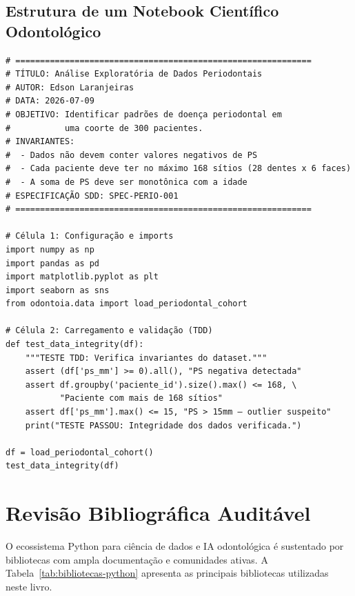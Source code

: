 \subsection{Estrutura de um Notebook Científico Odontológico}

\begin{verbatim}
# ============================================================
# TÍTULO: Análise Exploratória de Dados Periodontais
# AUTOR: Edson Laranjeiras
# DATA: 2026-07-09
# OBJETIVO: Identificar padrões de doença periodontal em
#           uma coorte de 300 pacientes.
# INVARIANTES:
#  - Dados não devem conter valores negativos de PS
#  - Cada paciente deve ter no máximo 168 sítios (28 dentes x 6 faces)
#  - A soma de PS deve ser monotônica com a idade
# ESPECIFICAÇÃO SDD: SPEC-PERIO-001
# ============================================================

# Célula 1: Configuração e imports
import numpy as np
import pandas as pd
import matplotlib.pyplot as plt
import seaborn as sns
from odontoia.data import load_periodontal_cohort

# Célula 2: Carregamento e validação (TDD)
def test_data_integrity(df):
    """TESTE TDD: Verifica invariantes do dataset."""
    assert (df['ps_mm'] >= 0).all(), "PS negativa detectada"
    assert df.groupby('paciente_id').size().max() <= 168, \
           "Paciente com mais de 168 sítios"
    assert df['ps_mm'].max() <= 15, "PS > 15mm — outlier suspeito"
    print("TESTE PASSOU: Integridade dos dados verificada.")

df = load_periodontal_cohort()
test_data_integrity(df)
\end{verbatim}

\section{Revisão Bibliográfica Auditável}

O ecossistema Python para ciência de dados e IA odontológica é sustentado por bibliotecas com ampla documentação e comunidades ativas. A Tabela~\ref{tab:bibliotecas-python} apresenta as principais bibliotecas utilizadas neste livro.

